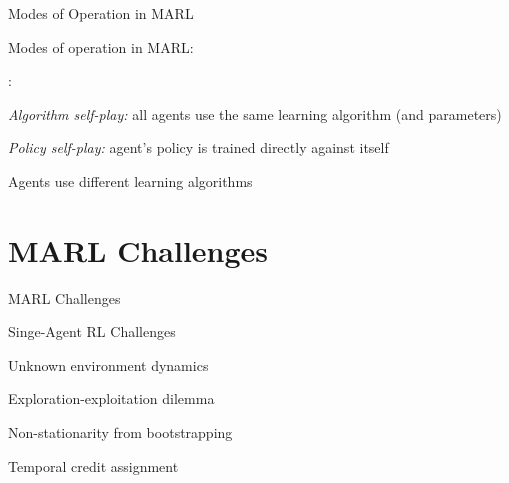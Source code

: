 \begin{frame}{Modes of Operation in MARL}

Modes of operation in MARL:

\vspace{5pt}

:
\blist
    \item {\it Algorithm self-play:} all agents use the same learning algorithm (and parameters)
    \item {\it Policy self-play:} agent's policy is trained directly against itself
\elist

\vspace{5pt}

\blist
    \item Agents use different learning algorithms
\elist
    
\end{frame}

\section{MARL Challenges}

\begin{frame}{MARL Challenges}

\small 

\bcol
		\begin{redtitlebox}{Singe-Agent RL Challenges}
		\blist
		    \item Unknown environment dynamics
		    \item Exploration-exploitation dilemma
		    \item Non-stationarity from bootstrapping
		    \item Temporal credit assignment
		\elist
		\end{redtitlebox}
		
\ecol    
\end{frame}

